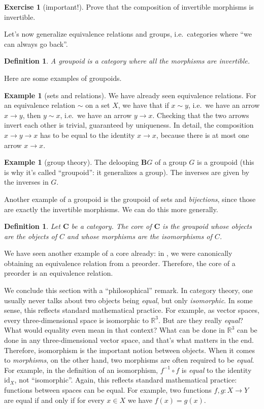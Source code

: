 \documentclass[a4paper,11pt,oneside]{scrbook}
\numberwithin{equation}{section}
\theoremstyle{plain}
\newtheorem{deph}[thm]{Definition}
\theoremstyle{definition}
\newtheorem{eg}[thm]{Example}
\newtheorem{ex}[thm]{Exercise}
\newcommand{\R}{\mathbb{R}}
\newcommand{\cat}[1]{{\mathbf{#1}}} %
\newcommand{\B}{\cat{B}} %
\DeclareMathOperator{\1}{\mathbbm{1}}
\DeclareMathOperator{\2}{\mathbbm{2}}
\newcommand{\id}{\mathrm{id}} %
\begin{document}
\begin{ex}[important!]
 Prove that the composition of invertible morphisms is invertible.
\end{ex}

Let's now generalize equivalence relations and groups, i.e.~categories where ``we can always go back''.

\begin{deph}
 A \emph{groupoid} is a category where all the morphisms are invertible.
\end{deph}

Here are some examples of groupoids. 

\begin{eg}[sets and relations]
 We have already seen equivalence relations. For an equivalence relation $\sim$ on a set $X$, we have that if $x\sim y$, i.e.~we have an arrow $x\to y$, then $y\sim x$, i.e.~we have an arrow $y\to x$. Checking that the two arrows invert each other is trivial, guaranteed by uniqueness. In detail, the composition $x\to y \to x$ has to be equal to the identity $x\to x$, because there is at most one arrow $x\to x$.
\end{eg}

\begin{eg}[group theory]
 The delooping $\B G$ of a group $G$ is a groupoid (this is why it's called ``groupoid'': it generalizes a group). The inverses are given by the inverses in $G$.
\end{eg}

Another example of a groupoid is the groupoid of sets and \emph{bijections}, since those are exactly the invertible morphisms. We can do this more generally. 

\begin{deph}\label{core}
 Let $\cat{C}$ be a category. The \emph{core} of $\cat{C}$ is the groupoid whose objects are the objects of $C$ and whose morphisms are the isomorphisms of $C$. 
\end{deph}

We have seen another example of a core already: in , we were canonically obtaining an equivalence relation from a preorder. Therefore, the core of a preorder is an equivalence relation.

We conclude this section with a ``philosophical'' remark. In category theory, one usually never talks about two objects being \emph{equal}, but only \emph{isomorphic}. In some sense, this reflects standard mathematical practice. For example, as vector spaces, every three-dimensional space is isomorphic to $\R^3$. But are they really \emph{equal}? What would equality even mean in that context? What can be done in $\R^3$ can be done in any three-dimensional vector space, and that's what matters in the end. Therefore, isomorphism is the important notion between objects. 
When it comes to \emph{morphisms}, on the other hand, two morphisms are often required to be \emph{equal}. For example, in the definition of an isomorphism, $f^{-1}\circ f$ is \emph{equal} to the identity $\id_X$, not ``isomorphic''.
Again, this reflects standard mathematical practice: functions between spaces can be equal. For example, two functions $f,g:X\to Y$ are equal if and only if for every $x\in X$ we have $f(x)=g(x)$. 
\end{document}
